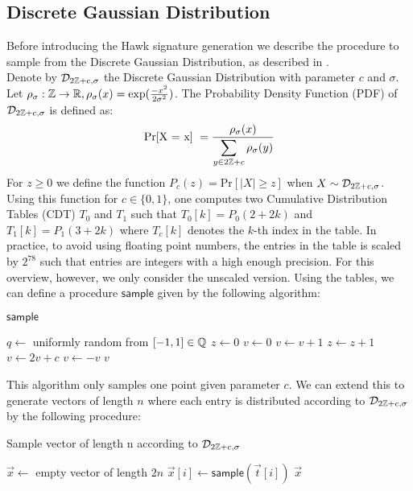 \subsection{Discrete Gaussian Distribution}
Before introducing the Hawk signature generation we describe the procedure to sample from the Discrete Gaussian Distribution, as described in \cite{HawkSpec24}. \\
Denote by $\mathcal{D}_{2\mathbb{Z} + c, \sigma }$ the Discrete Gaussian Distribution with parameter $c$ and $\sigma$.
Let $\rho_{\sigma}: \mathbb{Z} \rightarrow \mathbb{R}, \rho_{\sigma}(x) = \exp(\frac{-x^2}{2\sigma^2})$.
The Probability Density Function (PDF) of $\mathcal{D}_{2\mathbb{Z} + c, \sigma }$ is defined as:
\[
    \text{Pr[X = x] } = \frac{\rho_{\sigma}(x)}{\mathlarger{\sum_{y \in 2\bb{Z} + c} \rho_{\sigma}(y)}}
\]
For $z \geq 0$ we define the function $P_c(z) = \text{Pr}[ |X| \geq z ]$ when $X \sim \mathcal{D}_{2\mathbb{Z}+c, \sigma}$.
Using this function for $c \in \{0, 1\}$, one computes two Cumulative Distribution Tables (CDT) $T_0$ and $T_1$
such that $T_0[k] = P_0(2+2k)$ and $T_1[k] = P_1(3+2k)$ where $T_c[k]$ denotes the $k$-th index in the table.
In practice, to avoid using floating point numbers, the entries in the table is scaled by $2^{78}$ such that 
entries are integers with a high enough precision. For this overview, however, we only consider the unscaled version.
Using the tables, we can define a procedure $\mathsf{sample}$ given by the following algorithm:

\begin{algorithm}[H]\label{sample}
\caption{$\mathsf{sample}$}
\begin{algorithmic}[1]
    \State $q \gets$ uniformly random from $[-1, 1] \in \mathbb{Q}$
    \State $z \gets 0$
    \State $v \gets 0$
    \State $v \gets v + 1$
    \EndIf
    \State $z \gets z + 1$
    \State $v \gets 2v + c$
    \State $v \gets -v$
    \EndIf
    \EndWhile
    \State \Return $v$
\end{algorithmic}
\end{algorithm}

This algorithm only samples one point given parameter $c$.
We can extend this to generate vectors of length $n$ where each entry is distributed according to $\mathcal{D}_{2\mathbb{Z}+c, \sigma}$ by the following procedure:
\begin{algorithm}[H]
\caption{Sample vector of length n according to $\mathcal{D}_{2\mathbb{Z}+c, \sigma}$}
\begin{algorithmic}[1]
    \State $\vec{x} \gets$ empty vector of length $2n$
    \State $\vec{x}[i] \gets \mathsf{sample}(\vec{t}[i])$
    \EndFor
    \Return $\vec{x}$
\end{algorithmic}
\end{algorithm}

